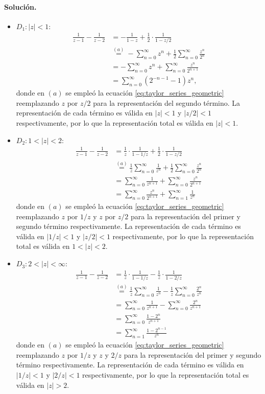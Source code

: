 \documentclass[a4paper]{report}
\begin{document}
\paragraph{Solución.}

\begin{itemize}
 \item \(D_1:|z|<1\):
 \begin{align*}
  \frac{1}{z-1}-\frac{1}{z-2}&=-\frac{1}{1-z}+\frac{1}{2}\cdot\frac{1}{1-z/2}\\
   &\overset{(a)}{=}-\sum_{n=0}^\infty z^n+\frac{1}{2}\sum_{n=0}^\infty\frac{z^n}{2^n}\\
   &=-\sum_{n=0}^\infty z^n+\sum_{n=0}^\infty\frac{z^n}{2^{n+1}}\\
   &=\sum_{n=0}^\infty(2^{-n-1}-1)z^n,
 \end{align*}
 donde en \((a)\) se empleó la ecuación \ref{eq:taylor_series_geometric} reemplazando \(z\) por \(z/2\) para la representación del segundo término. La representación de cada término es válida en \(|z|<1\) y \(|z/2|<1\) respectivamente, por lo que la representación total es válida en \(|z|<1\).
 \item \(D_2:1<|z|<2\):
 \begin{align*}
  \frac{1}{z-1}-\frac{1}{z-2}&=\frac{1}{z}\cdot\frac{1}{1-1/z}+\frac{1}{2}\cdot\frac{1}{1-z/2}\\
   &\overset{(a)}{=}\frac{1}{z}\sum_{n=0}^\infty\frac{1}{z^n}+\frac{1}{2}\sum_{n=0}^\infty\frac{z^n}{2^n}\\
   &=\sum_{n=0}^\infty\frac{1}{z^{n+1}}+\sum_{n=0}^\infty\frac{z^n}{2^{n+1}}\\
   &=\sum_{n=0}^\infty\frac{z^n}{2^{n+1}}+\sum_{n=1}^\infty\frac{1}{z^n}
 \end{align*}
 donde en \((a)\) se empleó la ecuación \ref{eq:taylor_series_geometric} reemplazando \(z\) por \(1/z\) y \(z\) por \(z/2\) para la representación del primer y segundo término respectivamente. La representación de cada término es válida en \(|1/z|<1\) y \(|z/2|<1\) respectivamente, por lo que la representación total es válida en \(1<|z|<2\).
 \item \(D_3:2<|z|<\infty\):
 \begin{align*}
  \frac{1}{z-1}-\frac{1}{z-2}&=\frac{1}{z}\cdot\frac{1}{1-1/z}-\frac{1}{z}\cdot\frac{1}{1-2/z}\\
   &\overset{(a)}{=}\frac{1}{z}\sum_{n=0}^\infty\frac{1}{z^n}-\frac{1}{z}\sum_{n=0}^\infty\frac{2^n}{z^n}\\
   &=\sum_{n=0}^\infty\frac{1}{z^{n+1}}-\sum_{n=0}^\infty\frac{2^n}{z^{n+1}}\\
   &=\sum_{n=0}^\infty\frac{1-2^n}{z^{n+1}}\\
   &=\sum_{n=1}^\infty\frac{1-2^{n-1}}{z^{n}}
 \end{align*}
 donde en \((a)\) se empleó la ecuación \ref{eq:taylor_series_geometric} reemplazando \(z\) por \(1/z\) y \(z\) y \(2/z\) para la representación del primer y segundo término respectivamente. La representación de cada término es válida en \(|1/z|<1\) y \(|2/z|<1\) respectivamente, por lo que la representación total es válida en \(|z|>2\).
\end{itemize}
\end{document}
